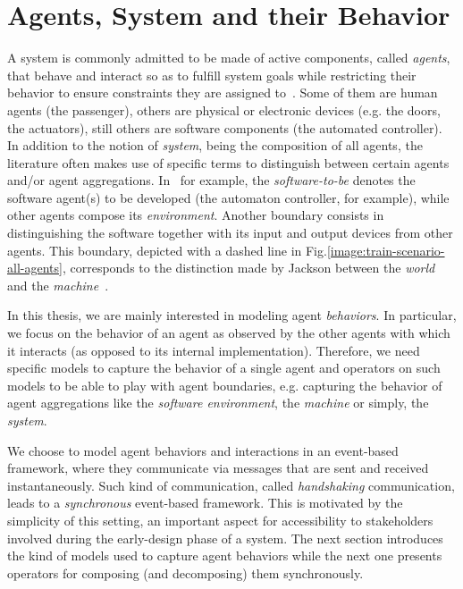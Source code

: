 \section{Agents, System and their Behavior}

A system is commonly admitted to be made of active components, called \emph{agents}, that behave and interact so as to fulfill system goals while restricting their behavior to ensure constraints they are assigned to~\cite{Feather:1987}. Some of them are human agents (the passenger), others are physical or electronic devices (e.g. the doors, the actuators), still others are software components (the automated controller). In addition to the notion of \emph{system}, being the composition of all agents, the literature often makes use of specific terms to distinguish between certain agents and/or agent aggregations. In~\cite{VanLamsweerde:2009} for example, the \emph{software-to-be} denotes the software agent(s) to be developed (the automaton controller, for example), while other agents compose its \emph{environment}. Another boundary consists in distinguishing the software together with its input and output devices from other agents. This boundary, depicted with a dashed line in Fig.\ref{image:train-scenario-all-agents}, corresponds to the distinction made by Jackson between the \emph{world} and the \emph{machine}~\cite{Jackson:1995}.

In this thesis, we are mainly interested in modeling agent \emph{behaviors}. In particular, we focus on the behavior of an agent as observed by the other agents with which it interacts (as opposed to its internal implementation). Therefore, we need specific models to capture the behavior of a single agent and operators on such models to be able to play with agent boundaries, e.g. capturing the behavior of agent aggregations like the \emph{software environment}, the \emph{machine} or simply, the \emph{system}. 

We choose to model agent behaviors and interactions in an event-based framework, where they communicate via messages that are sent and received instantaneously. Such kind of communication, called \emph{handshaking} communication, leads to a \emph{synchronous} event-based framework. This is motivated by the simplicity of this setting, an important aspect for accessibility to stakeholders involved during the early-design phase of a system. The next section introduces the kind of models used to capture agent behaviors while the next one presents operators for composing (and decomposing) them synchronously.

